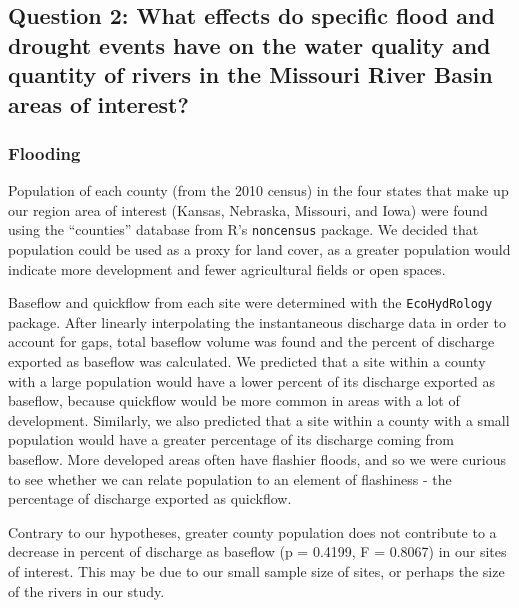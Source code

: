 \documentclass[12pt,]{article}
\begin{document}
\hypertarget{question-2-what-effects-do-specific-flood-and-drought-events-have-on-the-water-quality-and-quantity-of-rivers-in-the-missouri-river-basin-areas-of-interest}{%
\subsection{Question 2: What effects do specific flood and drought
events have on the water quality and quantity of rivers in the Missouri
River Basin areas of
interest?}\label{question-2-what-effects-do-specific-flood-and-drought-events-have-on-the-water-quality-and-quantity-of-rivers-in-the-missouri-river-basin-areas-of-interest}}

\hypertarget{flooding}{%
\subsubsection{Flooding}\label{flooding}}

Population of each county (from the 2010 census) in the four states that
make up our region area of interest (Kansas, Nebraska, Missouri, and
Iowa) were found using the ``counties'' database from R's
\texttt{noncensus} package. We decided that population could be used as
a proxy for land cover, as a greater population would indicate more
development and fewer agricultural fields or open spaces.

Baseflow and quickflow from each site were determined with the
\texttt{EcoHydRology} package. After linearly interpolating the
instantaneous discharge data in order to account for gaps, total
baseflow volume was found and the percent of discharge exported as
baseflow was calculated. We predicted that a site within a county with a
large population would have a lower percent of its discharge exported as
baseflow, because quickflow would be more common in areas with a lot of
development. Similarly, we also predicted that a site within a county
with a small population would have a greater percentage of its discharge
coming from baseflow. More developed areas often have flashier floods,
and so we were curious to see whether we can relate population to an
element of flashiness - the percentage of discharge exported as
quickflow.

Contrary to our hypotheses, greater county population does not
contribute to a decrease in percent of discharge as baseflow (p =
0.4199, F = 0.8067) in our sites of interest. This may be due to our
small sample size of sites, or perhaps the size of the rivers in our
study.
\end{document}
